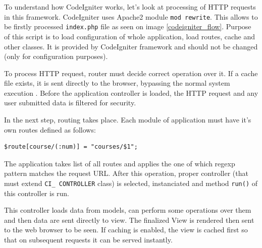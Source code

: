To understand how CodeIgniter works, let's look at processing of HTTP requests in this framework. CodeIgniter uses Apache2  module \texttt{mod rewrite}. This allows to be firstly processed \texttt{index.php} file as seen on image \ref{codeigniter_flow}. Purpose of this script is to load configuration of whole application, load routes, cache and other classes. It is provided by CodeIgniter framework and should not be changed (only for configuration purposes).



To process HTTP request, router must decide correct operation over it. If a cache file exists, it is sent directly to the browser, bypassing the normal system execution \cite{codeigniter}. Before the application controller is loaded, the HTTP request and any user submitted data is filtered for security.


In the next step, routing takes place. Each module of application must have it's own routes defined as follows:

\begin{lstlisting}[basicstyle=\small,caption={CodeIgniter routing}]
$route[course/(:num)] = "courses/$1";
\end{lstlisting}


The application takes list of all routes and applies the one of which regexp pattern matches the request URL. After this operation, proper controller (that must extend \texttt{CI\_ CONTROLLER} class) is selected, instanciated and method \texttt{run()} of this controller is run.


This controller loads data from models, can perform some operations over them and then data are sent directly to view. The finalized View is rendered then sent to the web browser to be seen. If caching is enabled, the view is cached first so that on subsequent requests it can be served instantly.


